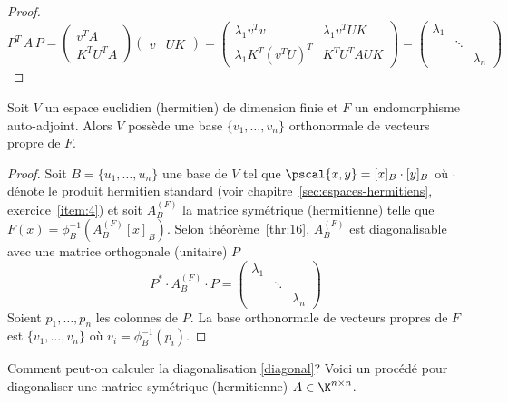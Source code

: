 \begin{proof}
\begin{displaymath}
  P^T \, A \, P =
  \begin{pmatrix}
    v^T A \\
    K^T U^T A 
  \end{pmatrix}
  \begin{pmatrix}
    v & U K
  \end{pmatrix} =
  \begin{pmatrix}
    \lambda_1 v^T v & \lambda_1 v^T U K \\
    \lambda_1 K^T (v^T U)^T & K^T U^T A U K
  \end{pmatrix} =
  \begin{pmatrix}
    \lambda_1 \\
    & \ddots \\
    && \lambda_n
  \end{pmatrix}  
\end{displaymath}
\end{proof}


\begin{corollary}
  \label{co:8}
  Soit $V$ un espace euclidien (hermitien) de dimension finie et $F$ un endomorphisme auto-adjoint. Alors $V$ possède une base $\{v_1,\dots,v_n\}$ orthonormale de vecteurs propre de $F$. 
\end{corollary}

\begin{proof}
  Soit $B = \{u_1,\dots,u_n\}$ une base de $V$ tel que $\pscal{x,y} = [x]_B \cdot [y]_B$ où $\cdot $ dénote le produit hermitien standard (voir chapitre~\ref{sec:espaces-hermitiens}, exercice~\ref{item:4}) et soit $A_B^{(F)}$  la matrice symétrique (hermitienne) telle que $F(x)  = \phi_B^{-1}(A_B^{(F)} [x]_B)$. Selon théorème~\ref{thr:16}, $A_B^{(F)}$ est diagonalisable avec une matrice orthogonale (unitaire) $P$ 
  \begin{displaymath}
    P^* \cdot 
    A_B^{(F)} \cdot  P  = \begin{pmatrix}
      \lambda_1 \\
      & \ddots \\
      & & \lambda_n
    \end{pmatrix}
  \end{displaymath}
 Soient $p_1,\dots,p_n$  les colonnes de $P$. La base orthonormale de vecteurs propres de $F$ est $\{v_1,\dots,v_n\}$ où $v_i = \phi_B^{-1}(p_i)$. 
\end{proof}



Comment peut-on calculer la diagonalisation \eqref{diagonal}? Voici un procédé pour diagonaliser une matrice symétrique (hermitienne) $A \in \K^{n \times n}$. 


